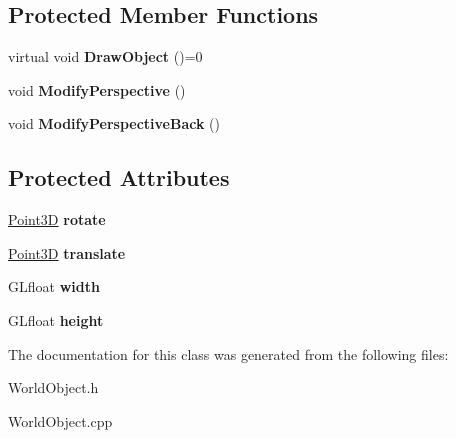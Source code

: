 \subsection*{Protected Member Functions}
\begin{DoxyCompactItemize}
\item 
\hypertarget{class_world_object_a22d6db7c7f7ac55f873d55417417d29d}{virtual void {\bfseries Draw\+Object} ()=0}\label{class_world_object_a22d6db7c7f7ac55f873d55417417d29d}

\item 
\hypertarget{class_world_object_a52db8a34a804e30a25043b8b118b3365}{void {\bfseries Modify\+Perspective} ()}\label{class_world_object_a52db8a34a804e30a25043b8b118b3365}

\item 
\hypertarget{class_world_object_a4873b7b568e1ce3886092823834c16b3}{void {\bfseries Modify\+Perspective\+Back} ()}\label{class_world_object_a4873b7b568e1ce3886092823834c16b3}

\end{DoxyCompactItemize}
\subsection*{Protected Attributes}
\begin{DoxyCompactItemize}
\item 
\hypertarget{class_world_object_ac6a87c572496ee57740aff2bf4cb7c07}{\hyperlink{struct_point3_d}{Point3\+D} {\bfseries rotate}}\label{class_world_object_ac6a87c572496ee57740aff2bf4cb7c07}

\item 
\hypertarget{class_world_object_a3e290757727e835e6a075d2565e093a7}{\hyperlink{struct_point3_d}{Point3\+D} {\bfseries translate}}\label{class_world_object_a3e290757727e835e6a075d2565e093a7}

\item 
\hypertarget{class_world_object_aa4d4ce305467868cdbb17fc25759408f}{G\+Lfloat {\bfseries width}}\label{class_world_object_aa4d4ce305467868cdbb17fc25759408f}

\item 
\hypertarget{class_world_object_a0457012633125921dd5c43e8538e8674}{G\+Lfloat {\bfseries height}}\label{class_world_object_a0457012633125921dd5c43e8538e8674}

\end{DoxyCompactItemize}


The documentation for this class was generated from the following files\+:\begin{DoxyCompactItemize}
\item 
World\+Object.\+h\item 
World\+Object.\+cpp\end{DoxyCompactItemize}
